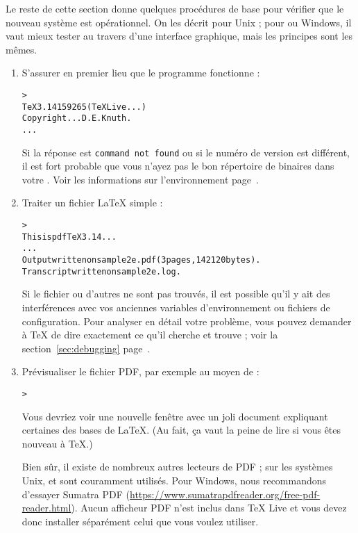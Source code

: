 \documentclass[german, english, french]{article}
\renewcommand{\TL}{\TeX{} Live\xspace}%
\begin{document}
Le reste de cette section donne quelques procédures de base pour vérifier que le
nouveau système est opérationnel. On les décrit pour Unix ; pour \macOS{} ou
Windows, il vaut mieux tester au travers d'une interface graphique, mais les
principes sont les mêmes.

\begin{enumerate}

\item S'assurer en premier lieu que le programme  fonctionne :

\begin{alltt}
> 
TeX 3.14159265 (TeX Live ...)
Copyright ... D.E. Knuth.
...
\end{alltt}

Si la réponse est \texttt{command not found} ou si le numéro de version est
différent, il est fort probable que vous n'ayez pas le bon répertoire de
binaires dans votre .  Voir les informations sur l'environnement
page~\pageref{sec:env}.

\item Traiter un fichier \LaTeX{} simple :

\begin{alltt}
> 
This is pdfTeX 3.14...
...
Output written on sample2e.pdf (3 pages, 142120 bytes).
Transcript written on sample2e.log.
\end{alltt}
Si le fichier  ou d'autres ne sont pas trouvés, il est
possible qu'il y ait des interférences avec vos anciennes variables
d'environnement ou fichiers de configuration. Pour analyser en détail votre
problème, vous pouvez demander à \TeX{} de dire exactement ce qu'il cherche et
trouve ; voir la section~\ref{sec:debugging} page~\pageref{sec:debugging}.

\item Prévisualiser le fichier PDF, par exemple au moyen de :
\begin{alltt}
> 
\end{alltt}
Vous devriez voir une nouvelle fenêtre avec un joli document expliquant
certaines des bases de \LaTeX{}.  (Au fait, ça vaut la peine de lire si
vous êtes nouveau à \TeX.)

Bien sûr, il existe de nombreux autres lecteurs de PDF ; sur les systèmes Unix,
 et  sont couramment utilisés. Pour Windows,
nous recommandons d'essayer Sumatra PDF
(\url{https://www.sumatrapdfreader.org/free-pdf-reader.html}). Aucun afficheur
PDF n'est inclus dans \TL{} et vous devez donc installer séparément celui que
vous voulez utiliser.


\end{enumerate}
\end{document}

